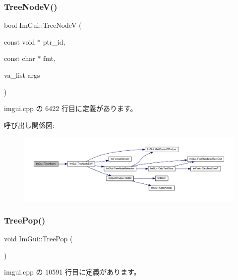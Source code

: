 \subsubsection{\texorpdfstring{Tree\+Node\+V()}{TreeNodeV()}\hspace{0.1cm}{\footnotesize\ttfamily [2/2]}}
{\footnotesize\ttfamily bool Im\+Gui\+::\+Tree\+NodeV (\begin{DoxyParamCaption}\item[{const void $\ast$}]{ptr\+\_\+id,  }\item[{const char $\ast$}]{fmt,  }\item[{va\+\_\+list}]{args }\end{DoxyParamCaption})}



 imgui.\+cpp の 6422 行目に定義があります。

呼び出し関係図\+:\nopagebreak
\begin{figure}[H]
\begin{center}
\leavevmode
\includegraphics[width=350pt]{namespace_im_gui_a15320f61ba6b4916af3323bf7844602e_cgraph}
\end{center}
\end{figure}
\mbox{\label{namespace_im_gui_a41ecf265e5f678c78fc9c30b3cf2077f}} 
\subsubsection{\texorpdfstring{Tree\+Pop()}{TreePop()}}
{\footnotesize\ttfamily void Im\+Gui\+::\+Tree\+Pop (\begin{DoxyParamCaption}{ }\end{DoxyParamCaption})}



 imgui.\+cpp の 10591 行目に定義があります。

